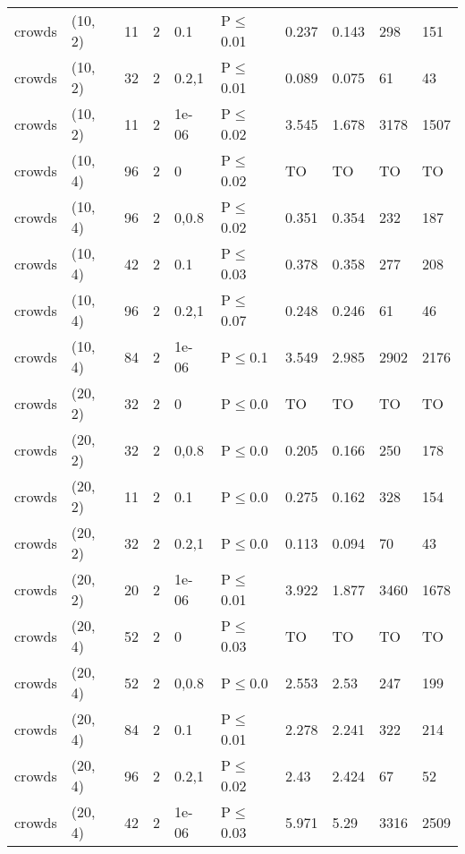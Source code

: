 \begin{longtable}{llrrllllll}
 crowds        & (10, 2)   &     	11 &   2 & 0.1   & P$\leq$0.01  & 0.237   & 0.143    & 298    & 151    \\
 crowds        & (10, 2)   &     	32 &   2 & 0.2,1 & P$\leq$0.01  & 0.089   & 0.075    & 61     & 43     \\
 crowds        & (10, 2)   &     	11 &   2 & 1e-06 & P$\leq$0.02  & 3.545   & 1.678    & 3178   & 1507   \\
 crowds        & (10, 4)   &     	96 &   2 & 0     & P$\leq$0.02  & TO      & TO       & TO     & TO     \\
 crowds        & (10, 4)   &     	96 &   2 & 0,0.8 & P$\leq$0.02  & 0.351   & 0.354    & 232    & 187    \\
 crowds        & (10, 4)   &     	42 &   2 & 0.1   & P$\leq$0.03  & 0.378   & 0.358    & 277    & 208    \\
 crowds        & (10, 4)   &     	96 &   2 & 0.2,1 & P$\leq$0.07  & 0.248   & 0.246    & 61     & 46     \\
 crowds        & (10, 4)   &     	84 &   2 & 1e-06 & P$\leq$0.1   & 3.549   & 2.985    & 2902   & 2176   \\
 crowds        & (20, 2)   &     	32 &   2 & 0     & P$\leq$0.0   & TO      & TO       & TO     & TO     \\
 crowds        & (20, 2)   &     	32 &   2 & 0,0.8 & P$\leq$0.0   & 0.205   & 0.166    & 250    & 178    \\
 crowds        & (20, 2)   &     	11 &   2 & 0.1   & P$\leq$0.0   & 0.275   & 0.162    & 328    & 154    \\
 crowds        & (20, 2)   &     	32 &   2 & 0.2,1 & P$\leq$0.0   & 0.113   & 0.094    & 70     & 43     \\
 crowds        & (20, 2)   &     	20 &   2 & 1e-06 & P$\leq$0.01  & 3.922   & 1.877    & 3460   & 1678   \\
 crowds        & (20, 4)   &     	52 &   2 & 0     & P$\leq$0.03  & TO      & TO       & TO     & TO     \\
 crowds        & (20, 4)   &     	52 &   2 & 0,0.8 & P$\leq$0.0   & 2.553   & 2.53     & 247    & 199    \\
 crowds        & (20, 4)   &     	84 &   2 & 0.1   & P$\leq$0.01  & 2.278   & 2.241    & 322    & 214    \\
 crowds        & (20, 4)   &     	96 &   2 & 0.2,1 & P$\leq$0.02  & 2.43    & 2.424    & 67     & 52     \\
 crowds        & (20, 4)   &     	42 &   2 & 1e-06 & P$\leq$0.03  & 5.971   & 5.29     & 3316   & 2509   \\

\end{longtable}
